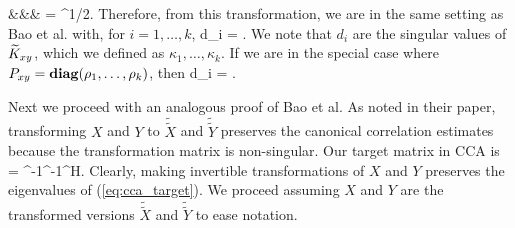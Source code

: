 &&& = \left[\begin{array}{cc}I_p & D_M \\ D_M^H &
    I_q\end{array}\right]^{1/2}\left[\begin{array}{c}W_1 \\ W_2\end{array}\right].
\ea\ee
Therefore, from this transformation, we are in the same setting as Bao et al. with, for
$i=1,\dots,k$,
\be
d_i = .
\ee
We note that $d_i$ are the singular values of $\widetilde{K}_{xy}$, which we defined as
$\kappa_1,\dots,\kappa_k$. If we are in the special case where $P_{xy}=\mathop{\bf diag}(\rho_1,\dots,\rho_{k})$, then 
\be
d_i =
 .
\ee

Next we proceed with an analogous proof of Bao et al. As noted in their paper, transforming $X$
and $Y$ to $\widetilde{\widetilde{X}}$ and $\widetilde{\widetilde{Y}}$ preserves the
canonical correlation estimates because the transformation matrix is
non-singular. Our target matrix in CCA is
\beq\label{eq:cca_target}
\Ccca = \Rxx^{-1}\Rxy\Ryy^{-1}\Rxy^H.
\eeq
Clearly, making invertible transformations of $X$ and $Y$ preserves the eigenvalues of
(\ref{eq:cca_target}). We proceed assuming $X$ and $Y$ are the transformed versions
$\widetilde{\widetilde{X}}$ and $\widetilde{\widetilde{Y}}$ to ease notation.

